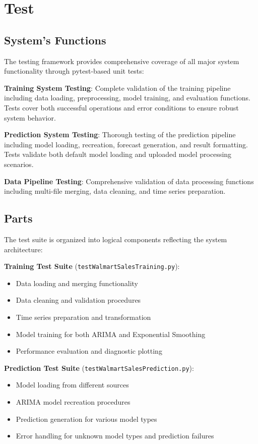 \section{Test}

\subsection{System's Functions}

The testing framework provides comprehensive coverage of all major system functionality through pytest-based unit tests:

\textbf{Training System Testing}: Complete validation of the training pipeline including data loading, preprocessing, model training, and evaluation functions. Tests cover both successful operations and error conditions to ensure robust system behavior.

\textbf{Prediction System Testing}: Thorough testing of the prediction pipeline including model loading, recreation, forecast generation, and result formatting. Tests validate both default model loading and uploaded model processing scenarios.

\textbf{Data Pipeline Testing}: Comprehensive validation of data processing functions including multi-file merging, data cleaning, and time series preparation.

\subsection{Parts}

The test suite is organized into logical components reflecting the system architecture:

\textbf{Training Test Suite} (\texttt{testWalmartSalesTraining.py}):
\begin{itemize}
	\item Data loading and merging functionality
	\item Data cleaning and validation procedures
	\item Time series preparation and transformation
	\item Model training for both ARIMA and Exponential Smoothing
	\item Performance evaluation and diagnostic plotting
\end{itemize}

\textbf{Prediction Test Suite} (\texttt{testWalmartSalesPrediction.py}):
\begin{itemize}
	\item Model loading from different sources
	\item ARIMA model recreation procedures
	\item Prediction generation for various model types
	\item Error handling for unknown model types and prediction failures
\end{itemize}

